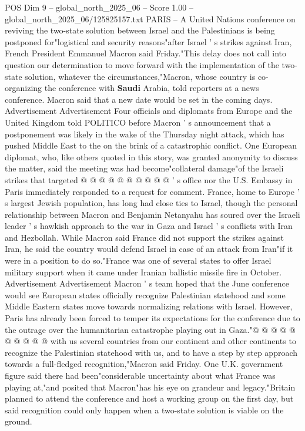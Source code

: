 \begin{textsample}{POS Dim 9 – global\_north\_2025\_06 – Score 1.00 – global\_north\_2025\_06/125825157.txt}  \label{ex:f9_pos_354}
PARIS -- A United Nations conference on reviving the two-state solution between Israel and the Palestinians is being postponed for"logistical and security reasons"after Israel ' s strikes against Iran, French President Emmanuel Macron said Friday."This delay does not call into question our determination to move forward with the implementation of the two-state solution, whatever the circumstances,"Macron, whose country is co-organizing the conference with \textbf{Saudi} Arabia, told reporters at a news conference.
Macron said that a new date would be set in the coming days.
Advertisement Advertisement Four officials and diplomats from Europe and the United Kingdom told POLITICO before Macron ' s announcement that a postponement was likely in the wake of the Thursday night attack, which has pushed Middle East to the on the brink of a catastrophic conflict.
One European diplomat, who, like others quoted in this story, was granted anonymity to discuss the matter, said the meeting was had become"collateral damage"of the Israeli strikes that targeted @ @ @ @ @ @ @ @ @ @ ' s office nor the U.S.
Embassy in Paris immediately responded to a request for comment.
France, home to Europe ' s largest Jewish population, has long had close ties to Israel, though the personal relationship between Macron and Benjamin Netanyahu has soured over the Israeli leader ' s hawkish approach to the war in Gaza and Israel ' s conflicts with Iran and Hezbollah.
While Macron said France did not support the strikes against Iran, he said the country would defend Israel in case of an attack from Iran"if it were in a position to do so."France was one of several states to offer Israel military support when it came under Iranian ballistic missile fire in October.
Advertisement Advertisement Macron ' s team hoped that the June conference would see European states officially recognize Palestinian statehood and some Middle Eastern states move towards normalizing relations with Israel.
However, Paris has already been forced to temper its expectations for the conference due to the outrage over the humanitarian catastrophe playing out in Gaza."@ @ @ @ @ @ @ @ @ @ with us several countries from our continent and other continents to recognize the Palestinian statehood with us, and to have a step by step approach towards a full-fledged recognition,"Macron said Friday.
One U.K. government figure said there had been"considerable uncertainty about what France was playing at,"and posited that Macron"has his eye on grandeur and legacy."Britain planned to attend the conference and host a working group on the first day, but said recognition could only happen when a two-state solution is viable on the ground.

\end{textsample}
